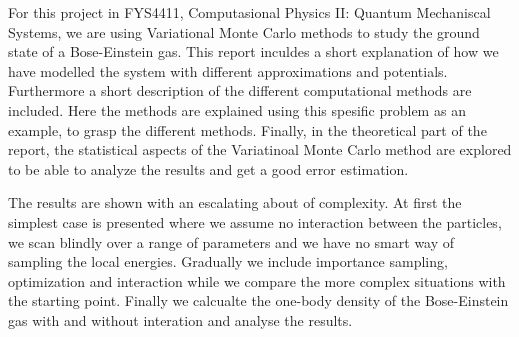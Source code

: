 For this project in FYS4411, Computasional Physics II: Quantum Mechaniscal Systems, we are using Variational Monte Carlo methods to study the ground state of a Bose-Einstein gas. This report inculdes a short explanation of how we have modelled the system with different approximations and potentials. Furthermore a short description of the different computational methods are included. Here the methods are explained using this spesific problem as an example, to grasp the different methods. Finally, in the theoretical part of the report, the statistical aspects of the Variatinoal Monte Carlo method are explored to be able to analyze the results and get a good error estimation.

The results are shown with an escalating about of complexity. At first the simplest case is presented where we assume no interaction between the particles, we scan blindly over a range of parameters and we have no smart way of sampling the local energies. Gradually we include importance sampling, optimization and interaction while we compare the more complex situations with the starting point. Finally we calcualte the one-body density of the Bose-Einstein gas with and without interation and analyse the results.